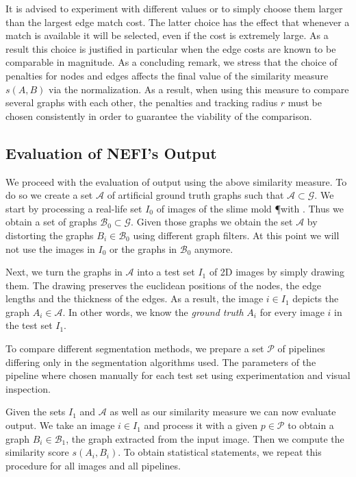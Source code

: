 		It is advised to experiment with different values or to simply choose them larger than the largest edge match cost. The latter choice has the effect that whenever a match is available it will be selected, even if the cost is extremely large. As a result this choice is justified in particular when the edge costs are known to be comparable in magnitude. As a concluding remark, we stress that the choice of penalties for nodes and edges affects the final value of the similarity measure $s(A, B)$ via the normalization. As a result, when using this measure to compare several graphs with each other, the penalties and tracking radius $r$ must be chosen consistently in order to guarantee the viability of the comparison.

	\subsection{Evaluation of NEFI's Output}\label{sec:evaluation}

		We proceed with the evaluation of \NEFIs output using the above similarity measure. To do so we create a set $\mathcal{A}$ of artificial ground truth graphs such that $\mathcal{A} \subset \mathcal{G}$. We start by processing a real-life set $I_0$ of images of the slime mold \P with \NEFI. Thus we obtain a set of graphs $\mathcal{B}_0 \subset \mathcal{G}$. Given those graphs we obtain the set $\mathcal{A}$ by distorting the graphs $B_i \in \mathcal{B}_0$ using different graph filters. At this point we will not use the images in $I_0$ or the graphs in $\mathcal{B}_0$ anymore. 

		Next, we turn the graphs in $\mathcal{A}$ into a test set $I_1$ of 2D images by simply drawing them. The drawing preserves the euclidean positions of the nodes, the edge lengths and the thickness of the edges. As a result, the image $i \in I_1$ depicts the graph $ A_i \in \mathcal{A}$. In other words, we know the \emph{ground truth} $A_i$ for every image $i$ in the test set $I_1$.

		To compare different segmentation methods, we prepare a set $\mathcal{P}$ of pipelines differing only in the segmentation algorithms used. The parameters of the pipeline where chosen manually for each test set using experimentation and visual inspection.

		Given the sets $I_1$ and $\mathcal{A}$ as well as our similarity measure we can now evaluate \NEFIs output. We take an image $i \in I_1$ and process it with a given $p \in \mathcal{P}$ to obtain a graph $B_i \in \mathcal{B}_1$, \ie the graph \NEFI extracted from the input image. Then we compute the similarity score $s(A_i, B_i)$. To obtain statistical statements, we repeat this procedure for all images and all pipelines.

